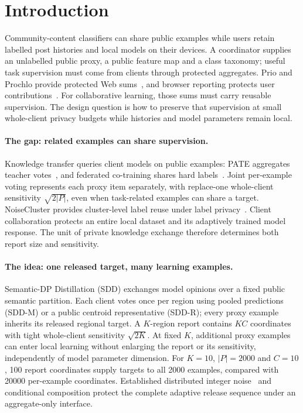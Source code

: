 \section{Introduction}
\label{sec:intro}

Community-content classifiers can share public examples while users retain
labelled post histories and local models on their devices. A coordinator
supplies an unlabelled public proxy, a public feature map and a class taxonomy;
useful task supervision must come from clients through protected aggregates.
Prio and Prochlo provide protected Web sums~\cite{corriganGibbs2017prio,bittau2017prochlo},
and browser reporting protects user contributions~\cite{erlingsson2014rappor,ghazi2025sandbox,aksu2023summary}.
For collaborative learning, those sums must carry reusable supervision.
The design question is how to preserve that supervision at small whole-client
privacy budgets while histories and model parameters remain local.

\paragraph{The gap: related examples can share supervision.}
Knowledge transfer queries client models on public examples: PATE aggregates
teacher votes~\cite{papernot2017semi,papernot2018scalable}, and federated
co-training shares hard labels~\cite{abourayya2025little}. Joint per-example
voting represents each proxy item separately, with replace-one whole-client
sensitivity $\sqrt{2|P|}$, even when task-related examples can share a target.
NoiseCluster provides cluster-level label reuse under label
privacy~\cite{tang2022labels}. Client collaboration protects an entire local
dataset and its adaptively trained model response. The unit of private
knowledge exchange therefore determines both report size and sensitivity.

\paragraph{The idea: one released target, many learning examples.}
Semantic-DP Distillation (SDD) exchanges model opinions over a fixed public
semantic partition. Each client votes once per region using pooled predictions
(SDD-M) or a public centroid representative (SDD-R); every proxy example
inherits its released regional target. A $K$-region report contains $KC$
coordinates with tight whole-client sensitivity $\sqrt{2K}$.
At fixed $K$, additional proxy examples can enter local learning without
enlarging the report or its sensitivity, independently of model parameter
dimension. For $K=10$, $|P|=2000$ and $C=10$, 100 report coordinates supply
targets to all 2000 examples, compared with 20000 per-example coordinates.
Established distributed integer noise~\cite{kairouz2021distributed} and
conditional composition protect the complete adaptive release sequence under
an aggregate-only interface.

